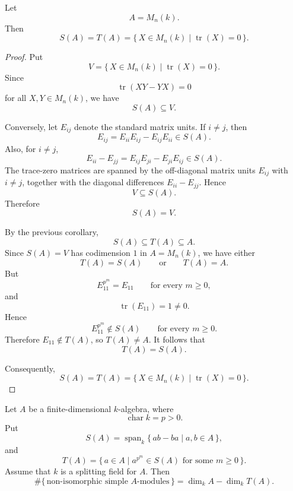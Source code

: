 \begin{lemma}
    Let
    \[
        A=M_n(k).
    \]
    Then
    \[
        S(A)=T(A)=\{\,X\in M_n(k)\mid \operatorname{tr}(X)=0\,\}.
    \]
\end{lemma}

\begin{proof}
    Put
    \[
        V=\{\,X\in M_n(k)\mid \operatorname{tr}(X)=0\,\}.
    \]
    Since
    \[
        \operatorname{tr}(XY-YX)=0
    \]
    for all \(X,Y\in M_n(k)\), we have
    \[
        S(A)\subseteq V.
    \]

    Conversely, let \(E_{ij}\) denote the standard matrix units. If \(i\neq j\), then
    \[
        E_{ij}
        =
        E_{ii}E_{ij}-E_{ij}E_{ii}
        \in S(A).
    \]
    Also, for \(i\neq j\),
    \[
        E_{ii}-E_{jj}
        =
        E_{ij}E_{ji}-E_{ji}E_{ij}
        \in S(A).
    \]
    The trace-zero matrices are spanned by the off-diagonal matrix units \(E_{ij}\)
    with \(i\neq j\), together with the diagonal differences \(E_{ii}-E_{jj}\). Hence
    \[
        V\subseteq S(A).
    \]
    Therefore
    \[
        S(A)=V.
    \]

    By the previous corollary,
    \[
        S(A)\subseteq T(A)\subseteq A.
    \]
    Since \(S(A)=V\) has codimension \(1\) in \(A=M_n(k)\), we have either
    \[
        T(A)=S(A)
        \qquad\text{or}\qquad
        T(A)=A.
    \]
    But
    \[
        E_{11}^{p^m}=E_{11}
        \qquad\text{for every }m\geq 0,
    \]
    and
    \[
        \operatorname{tr}(E_{11})=1\neq 0.
    \]
    Hence
    \[
        E_{11}^{p^m}\notin S(A)
        \qquad\text{for every }m\geq 0.
    \]
    Therefore \(E_{11}\notin T(A)\), so \(T(A)\neq A\). It follows that
    \[
        T(A)=S(A).
    \]

    Consequently,
    \[
        S(A)=T(A)=\{\,X\in M_n(k)\mid \operatorname{tr}(X)=0\,\}.
    \]
\end{proof}

\begin{proposition}
    Let \(A\) be a finite-dimensional \(k\)-algebra, where
    \[
        \operatorname{char} k=p>0.
    \]
    Put
    \[
        S(A)=\operatorname{span}_k\{\,ab-ba\mid a,b\in A\,\},
    \]
    and
    \[
        T(A)=\{\,a\in A\mid a^{p^m}\in S(A)
        \text{ for some }m\geq 0\,\}.
    \]
    Assume that \(k\) is a splitting field for \(A\). Then
    \[
        \#\{\,\text{non-isomorphic simple }A\text{-modules}\,\}
        =
        \dim_k A-\dim_k T(A).
    \]
\end{proposition}


